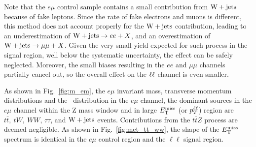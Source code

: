 Note that the $e\mu$ control sample contains a small contribution from
$\mathrm{W}+{\mathrm{jets}}$ because of fake leptons. Since the rate of fake
electrons and muons is different, this method does not account
properly for the $\mathrm{W}+{\mathrm{jets}}$ contribution, leading to an
underestimation of $\mathrm{W}+{\mathrm{jets}}\to ee+X$, and an
overestimation of $\mathrm{W}+{\mathrm{jets}}\to \mu\mu+X$. Given the very 
small yield expected for such process in the signal region, well below
the systematic uncertainty, the effect can be safely
neglected. Moreover, the small biases resulting in the $ee$ and
$\mu\mu$ channels partially cancel out, so the overall effect on the
$\ell\ell$ channel is even smaller. 

As shown in Fig.~\ref{fig:m_em},
the $e\mu$ invariant mass, transverse momentum distributions and the \met\ distribution in
the $e\mu$ channel, the dominant sources in the $e\mu$ channel within
the Z mass window and in large $E_{\mathrm{T}}^{\text{miss}}$ (or $p_{T}^{\ell\ell}$) region are
$t\bar t, \ tW, \ WW $, $\tau\tau$, and $\mathrm{W}+{\mathrm{jets}}$ events. Contributions from the $t\bar t Z$ process
are deemed negligible.
As shown in Fig.~\ref{fig:met_tt_ww}, the shape of the $E_\mathrm{T}^{\mathrm{miss}}$ spectrum is identical in the $e\mu$ control region
and the $\ell\ell$ signal region.


